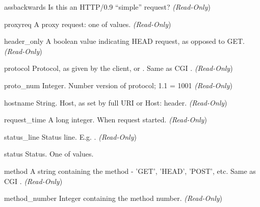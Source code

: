 \begin{memberdesc}[request]{assbackwards}
  Is this an HTTP/0.9 ``simple'' request? 
  \emph{(Read-Only})
\end{memberdesc}

\begin{memberdesc}[request]{proxyreq}
  A proxy request: one of  values.
  \emph{(Read-Only})
\end{memberdesc}

\begin{memberdesc}[request]{header_only}
  A boolean value indicating HEAD request, as opposed to GET. 
  \emph{(Read-Only})
\end{memberdesc}

\begin{memberdesc}[request]{protocol}
  Protocol, as given by the client, or . Same as CGI .
  \emph{(Read-Only})
\end{memberdesc}

\begin{memberdesc}[request]{proto_num}
  Integer. Number version of protocol; 1.1 = 1001 
  \emph{(Read-Only})
\end{memberdesc}

\begin{memberdesc}[request]{hostname}
  String. Host, as set by full URI or Host: header.
  \emph{(Read-Only})
\end{memberdesc}

\begin{memberdesc}[request]{request_time}
  A long integer. When request started.
  \emph{(Read-Only})
\end{memberdesc}

\begin{memberdesc}[request]{status_line}
  Status line. E.g. . 
  \emph{(Read-Only})
\end{memberdesc}

\begin{memberdesc}[request]{status}
  Status. One of  values.
\end{memberdesc}

\begin{memberdesc}[request]{method}
  A string containing the method - 'GET', 'HEAD', 'POST', etc.
  Same as CGI .
  \emph{(Read-Only})
\end{memberdesc}

\begin{memberdesc}[request]{method_number}
  Integer containing the method number.
  \emph{(Read-Only})
\end{memberdesc}

